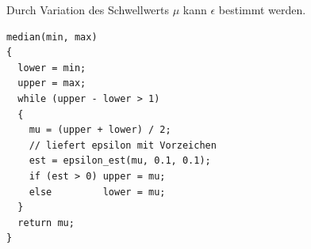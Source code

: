 
\begin{slide*}\sf
{}
Durch Variation des Schwellwerts $\mu$ kann $\epsilon$ bestimmt werden.
\begin{verbatim}
median(min, max)
{
  lower = min;
  upper = max;
  while (upper - lower > 1)
  {
    mu = (upper + lower) / 2;
    // liefert epsilon mit Vorzeichen
    est = epsilon_est(mu, 0.1, 0.1); 
    if (est > 0) upper = mu;
    else         lower = mu;
  }
  return mu;
}
\end{verbatim}
\end{slide*}




